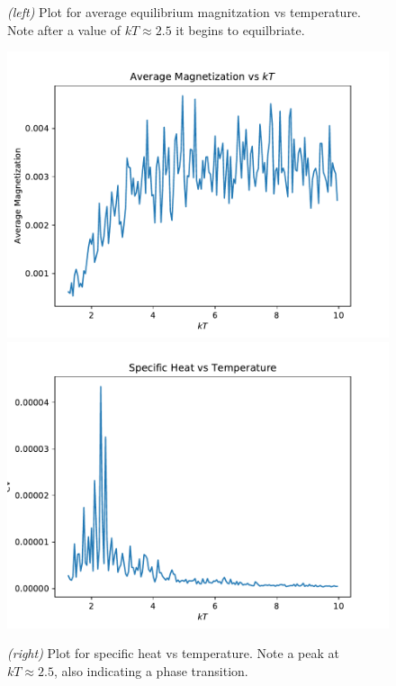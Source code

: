 \documentclass{article}
\begin{document}
\begin{figure}[H]
  \caption{\textit{(left)} Plot for average equilibrium magnitzation vs temperature.
  Note after a value of $kT \approx 2.5$ it begins to equilbriate.}
  \includegraphics[scale=0.4]{g_mags.pdf}
  \includegraphics[scale=0.4]{g_cv.pdf}
  \caption{\textit{(right)} Plot for specific heat vs temperature. Note a peak at
  $kT \approx 2.5$, also indicating a phase transition.}
\end{figure}
\end{document}
